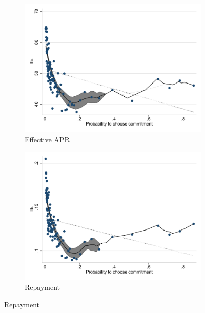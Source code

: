 \documentclass[oneside,11pt]{article}
\begin{document}
\begin{figure}[H]
    \caption{Effect of CATE benefit vs predicted take-up}
    \label{HTE_vs_propensity}
    \begin{center}
    \begin{subfigure}{0.475\textwidth}
        \caption{Effective APR}
        \centering
        \includegraphics[width=\textwidth]{Figuras/benefit_choice_tau_apr.pdf}
    \end{subfigure}
    \begin{subfigure}{0.475\textwidth}
        \caption{Repayment}
        \centering
        \includegraphics[width=\textwidth]{Figuras/benefit_choice_tau_des.pdf}
    \end{subfigure}
  

\end{center}
\end{figure}
\end{document}
